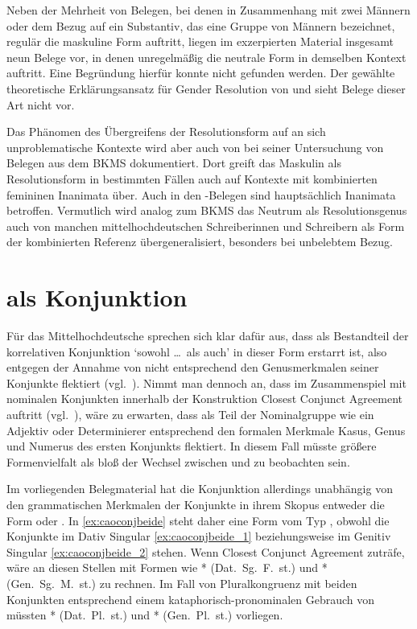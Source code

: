Neben der Mehrheit von Belegen, bei denen in Zusammenhang mit zwei Männern oder
dem Bezug auf ein Substantiv, das eine Gruppe von Männern bezeichnet, regulär
die maskuline Form  auftritt, liegen im exzerpierten Material
insgesamt neun Belege vor, in denen unregelmäßig die neutrale Form
 in demselben Kontext auftritt. Eine Begründung hierfür konnte
nicht gefunden werden. Der gewählte theoretische Erklärungsansatz für Gender
Resolution von \citet{wechslerzlatic2003} und \citet{wechsler2009} sieht Belege
dieser Art nicht vor.

Das Phänomen des Übergreifens der Resolutionsform auf an sich unproblematische
Kontexte wird aber auch von \citet[302]{corbett1991} bei seiner Untersuchung
von Belegen aus dem BKMS dokumentiert. Dort greift das Maskulin als
Resolutionsform in bestimmten Fällen auch auf Kon\-texte mit kombinierten
femininen Inanimata über. Auch in den \CAO{}-Belegen sind hauptsächlich
Inanimata betroffen. Vermutlich wird analog zum BKMS das Neutrum als
Resolutionsgenus auch von manchen mittelhochdeutschen Schreiberinnen und
Schreibern als Form der kombinierten Referenz übergeneralisiert, besonders bei
unbelebtem Bezug.


\section{ als Konjunktion}
\label{sec:beideconj}

Für das Mittelhochdeutsche sprechen sich \citet[626--627]{ksw2} klar dafür aus,
dass  als Bestandteil der korrelativen Konjunktion  `sowohl \dots\ als auch' in dieser Form erstarrt ist, also
 entgegen der Annahme von \citet{askedal1974} nicht entsprechend
den Genusmerkmalen seiner Konjunkte flektiert (vgl.~).
Nimmt man dennoch an, dass im Zusammenspiel mit nominalen Konjunkten innerhalb
der Konstruktion Closest Conjunct Agreement auftritt (vgl.~),
wäre zu erwarten, dass  als Teil der Nominalgruppe wie ein Adjektiv
oder Determinierer entsprechend den formalen Merkmale Kasus, Genus und Numerus
des ersten Konjunkts flektiert. In diesem Fall müsste größere Formenvielfalt
als bloß der Wechsel zwischen  und  zu beobachten
sein.

Im vorliegenden Belegmaterial hat die Konjunktion allerdings unabhängig von den
grammatischen Merkmalen der Konjunkte in ihrem Skopus entweder die Form
 oder . In \cref{ex:caoconjbeide} steht daher eine
Form vom Typ , obwohl die Konjunkte im Dativ Singular
\cref{ex:caoconjbeide_1} beziehungsweise im Genitiv Singular
\cref{ex:caoconjbeide_2} stehen. Wenn Closest Conjunct Agreement zuträfe, wäre
an diesen Stellen mit Formen wie * (Dat.~Sg.~F.~st.) und
* (Gen.~Sg.~M.~st.) zu rechnen. Im Fall von Pluralkongruenz mit
beiden Konjunkten entsprechend einem kataphorisch-pronominalen Gebrauch von
 müssten * (Dat.\ Pl.\ st.) und *
(Gen.\ Pl.\ st.) vorliegen.

